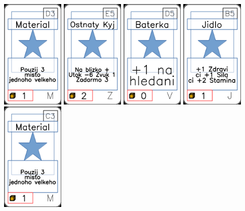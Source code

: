 \documentclass[a4paper]{article}
\begin{document}
	\includegraphics[width=3.0cm]{img-1_47}
	\includegraphics[width=3.0cm]{img-1_84}
	\includegraphics[width=3.0cm]{img-1_79}
	\includegraphics[width=3.0cm]{img-1_9}
	\includegraphics[width=3.0cm]{img-1_42}
\end{document}
